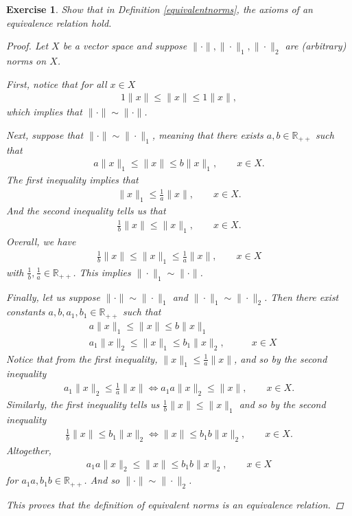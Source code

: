 \documentclass[11pt]{article}
\theoremstyle{mystyle}
\newtheorem{protoexer}{Exercise}[section]
\newenvironment{exer}
{\colorlet{shadecolor}{blue!15}\begin{shaded}\begin{protoexer}}
{\end{protoexer}\end{shaded}}
\newcommand{\0}{\mathbf{0}}
\begin{document}
\begin{exer}\label{equivalentnormsequivalencerelation}
Show that in Definition \ref{equivalentnorms}, the axioms of an equivalence relation hold.
\begin{proof}
Let $X$ be a vector space and suppose $\|\cdot\|, \|\cdot\|_1, \|\cdot\|_2$ are (arbitrary) norms on $X$.

First, notice that for all $x \in X$
\begin{align*}
    1\|x\| \leq \|x\| \leq 1\|x\|,
\end{align*}
which implies that $\|\cdot\| \sim \|\cdot\|$.

Next, suppose that $\|\cdot\| \sim \|\cdot\|_1$, meaning that there exists $a, b \in \mathbb{R}_{++}$ such that
\begin{align*}
    a\|x\|_1 \leq \|x\| \leq b\|x\|_1, \qquad x \in X.
\end{align*}
The first inequality implies that
\begin{align*}
    \|x\|_1 \leq \frac{1}{a}\|x\|, \qquad x \in X.
\end{align*}
And the second inequality tells us that
\begin{align*}
    \frac{1}{b}\|x\| \leq \|x\|_1, \qquad x \in X.
\end{align*}
Overall, we have
\begin{align*}
    \frac{1}{b}\|x\| \leq \|x\|_1 \leq \frac{1}{a}\|x\|, \qquad x \in X
\end{align*}
with $\frac{1}{b}, \frac{1}{a} \in \mathbb{R}_{++}$. This implies $\|\cdot\|_1 \sim \|\cdot\|$.

Finally, let us suppose $\|\cdot\| \sim \|\cdot\|_1$ and $\|\cdot\|_1 \sim \|\cdot\|_2$. Then there exist constants $a, b, a_1, b_1 \in \mathbb{R}_{++}$ such that 
\begin{align*}
    &a\|x\|_1 \leq \|x\| \leq b \|x\|_1\\
    &a_1\|x\|_2 \leq \|x\|_1 \leq b_1 \|x\|_2, \qquad &x \in X
\end{align*}
Notice that from the first inequality, $\|x\|_1 \leq \frac{1}{a}\|x\|$, and so by the second inequality
\begin{align*}
    a_1\|x\|_2 \leq \frac{1}{a}\|x\| \iff a_1a\|x\|_2 \leq \|x\|, \qquad x \in X.
\end{align*}
Similarly, the first inequality tells us $\frac{1}{b}\|x\| \leq \|x\|_1$ and so by the second inequality
\begin{align*}
    \frac{1}{b}\|x\| \leq b_1\|x\|_2 \iff \|x\| \leq b_1 b\|x\|_2, \qquad x \in X.
\end{align*}
Altogether,
\begin{align*}
    a_1a\|x\|_2 \leq \|x\| \leq b_1 b\|x\|_2, \qquad x \in X
\end{align*}
for $a_1a,  b_1 b \in \mathbb{R}_{++}$. And so $\|\cdot\| \sim \|\cdot\|_2$.

This proves that the definition of equivalent norms is an equivalence relation.
\end{proof}
\end{exer}
\end{document}
